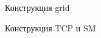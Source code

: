 \documentclass[a4paper,14pt,russian]{extreport}
\begin{document}
\begin{figure}[h]
\caption{Конструкция grid}
\label{ris:thread_block}
\end{figure}
\par
\begin{figure}[h]
\caption{Конструкция TCP и SM}
\label{ris:tcp}
\end{figure}
\end{document}
